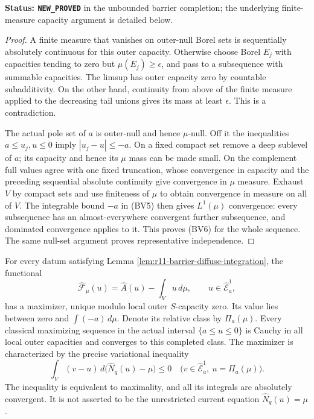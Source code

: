 \noindent\textbf{Status: \texttt{NEW\_PROVED}}
in the unbounded barrier completion; the underlying
finite-measure capacity argument is detailed below.

\begin{proof}
A finite measure that vanishes on outer-null Borel
sets is sequentially absolutely continuous for this
outer capacity.  Otherwise choose Borel $E_j$ with
capacities tending to zero but $\mu(E_j)\geq\epsilon$,
and pass to a subsequence with summable capacities.
The limsup has outer capacity zero by countable
subadditivity.  On the other hand, continuity from
above of the finite measure applied to the decreasing
tail unions gives its mass at least $\epsilon$.
This is a contradiction.

The actual pole set of $a$ is outer-null and hence
$\mu$-null.  Off it the inequalities
$a\leq u_j,u\leq0$ imply
$|u_j-u|\leq-a$.
On a fixed compact set remove a deep sublevel of $a$;
its capacity and hence its $\mu$ mass can be made
small.  On the complement full values agree with
one fixed truncation, whose convergence in capacity
and the preceding sequential absolute continuity
give convergence in $\mu$ measure.
Exhaust $V$ by compact sets and use finiteness of
$\mu$ to obtain convergence in measure on all of $V$.
The integrable bound $-a$ in (BV5) then gives
$L^1(\mu)$ convergence: every subsequence has an
almost-everywhere convergent further subsequence,
and dominated convergence applies to it.
This proves (BV6) for the whole sequence.
The same null-set argument proves representative
independence.
\end{proof}

\begin{theorem}
\label{thm:r11-completed-barrier-maximizer}
For every datum satisfying Lemma
\ref{lem:r11-barrier-diffuse-integration}, the functional
\[
      \widehat{\mathcal F}_\mu(u)
            =\widehat A(u)-\int_Vu\,d\mu,
              \qquad u\in\widehat{\mathcal E}^1_a,
 \tag{BV7}
\]
has a maximizer, unique modulo local outer
$S$-capacity zero.  Its value lies between zero
and $\int(-a)\,d\mu$.
Denote its relative class by $\Pi_a(\mu)$.
Every classical maximizing sequence in the
actual interval $\{a\leq u\leq0\}$ is Cauchy
in all local outer capacities and converges to
this completed class.
The maximizer is characterized by the precise
variational inequality
\[
 \int_V(v-u)\,d\bigl(\widehat N_q(u)-\mu\bigr)
               \leq0
       \quad\bigl(v\in\widehat{\mathcal E}^1_a,\ u=\Pi_a(\mu)\bigr).
 \tag{BV8}
\]
The inequality is equivalent to maximality, and
all its integrals are absolutely convergent.
It is not asserted to be the unrestricted
current equation $\widehat N_q(u)=\mu$.
\end{theorem}

